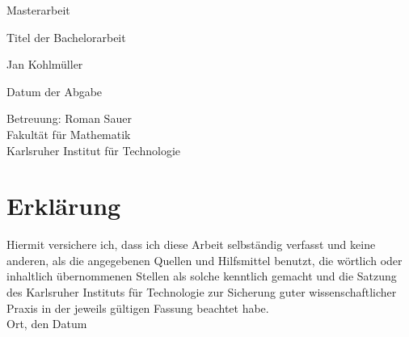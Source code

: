 \documentclass[12pt,a4paper]{scrartcl}
\numberwithin{equation}{section}
\newcommand{\2}{\mathbb{Z} / 2 \mathbb{Z}}
\begin{document}
	\pagestyle{empty}
	\begin{titlepage}

 \begin{center} \large 
		
		Masterarbeit
		\vspace*{2cm}

		{\huge Titel der Bachelorarbeit}
		\vspace*{2.5cm}

		Jan Kohlmüller
		\vspace*{1.5cm}

		Datum der Abgabe
		\vspace*{4.5cm}


		Betreuung: Roman Sauer \\[1cm]
		Fakultät für Mathematik \\[1cm]
		Karlsruher Institut für Technologie
	\end{center}
\end{titlepage}

\tableofcontents

\newpage
 
\pagestyle{headings}






\newpage

\section*{Erklärung}

Hiermit versichere ich, dass ich diese Arbeit selbständig verfasst und keine anderen, als die angegebenen Quellen und Hilfsmittel benutzt, die wörtlich oder inhaltlich übernommenen Stellen als solche kenntlich gemacht und die Satzung des Karlsruher Instituts für Technologie zur Sicherung guter wissenschaftlicher Praxis in der jeweils gültigen Fassung beachtet habe. \\[2ex] 

\noindent
Ort, den Datum\\[5ex]
\end{document}
